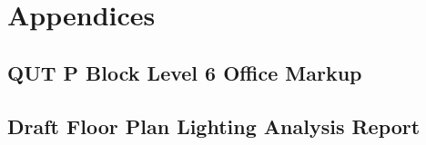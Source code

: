 \section{Appendices}

\subsection{QUT P Block Level 6 Office Markup}
\label{appendix:qut_lvl6_markup}



\subsection{Draft Floor Plan Lighting Analysis Report}

\label{appenddix:DraftFloorPlanLighting}



